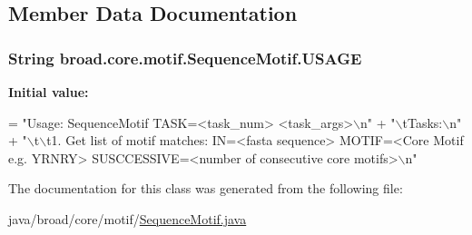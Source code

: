 \subsection{Member Data Documentation}
\hypertarget{classbroad_1_1core_1_1motif_1_1_sequence_motif_a42b39e7c23f08eb5d93f51d06f1826fb}{
\subsubsection[{U\+S\+A\+G\+E}]{\setlength{\rightskip}{0pt plus 5cm}String broad.\+core.\+motif.\+Sequence\+Motif.\+U\+S\+A\+G\+E\hspace{0.3cm}{\ttfamily [static]}}}\label{classbroad_1_1core_1_1motif_1_1_sequence_motif_a42b39e7c23f08eb5d93f51d06f1826fb}
{\bfseries Initial value\+:}
\begin{DoxyCode}
= \textcolor{stringliteral}{"Usage: SequenceMotif TASK=<task\_num> <task\_args>\(\backslash\)n"} +
    \textcolor{stringliteral}{"\(\backslash\)tTasks:\(\backslash\)n"} +
    \textcolor{stringliteral}{"\(\backslash\)t\(\backslash\)t1. Get list of motif matches: IN=<fasta sequence> MOTIF=<Core Motif e.g. YRNRY>
       SUSCCESSIVE=<number of consecutive core motifs>\(\backslash\)n"}
\end{DoxyCode}


The documentation for this class was generated from the following file\+:\begin{DoxyCompactItemize}
\item 
java/broad/core/motif/\hyperlink{_sequence_motif_8java}{Sequence\+Motif.\+java}\end{DoxyCompactItemize}
